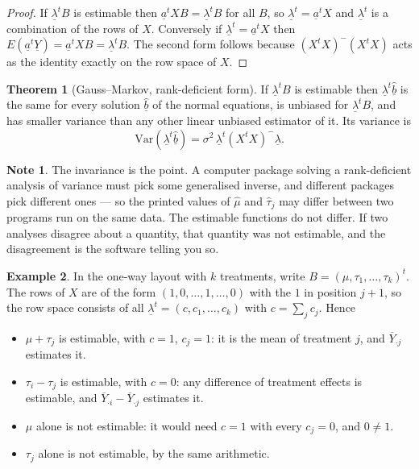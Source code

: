 \documentclass[11pt,a4paper]{article}
\theoremstyle{definition}
\newtheorem{thm}{Theorem}[subsection]
\newtheorem{exa}[thm]{Example}
\newtheorem*{note}{Note}
\begin{document}
\begin{proof}
If $\underline{\lambda}^tB$ is estimable then
$\underline{a}^tXB=\underline{\lambda}^tB$ for all $B$, so
$\underline{\lambda}^t=\underline{a}^tX$ and $\underline{\lambda}^t$ is a
combination of the rows of $X$. Conversely if
$\underline{\lambda}^t=\underline{a}^tX$ then
$E\left(\underline{a}^t\underline{Y}\right)=\underline{a}^tXB
=\underline{\lambda}^tB$. The second form follows because
$\left(X^tX\right)^{-}\left(X^tX\right)$ acts as the identity exactly on the
row space of $X$.
\end{proof}

\begin{thm}[Gauss--Markov, rank-deficient form]
\label{res:thm:gmdeficient}
If $\underline{\lambda}^tB$ is estimable then
$\underline{\lambda}^t\widehat{\underline{b}}$ is the same for every solution
$\widehat{\underline{b}}$ of the normal equations, is unbiased for
$\underline{\lambda}^tB$, and has smaller variance than any other linear
unbiased estimator of it. Its variance is
$$\text{Var}\left(\underline{\lambda}^t\widehat{\underline{b}}\right)
=\sigma^2\,\underline{\lambda}^t\left(X^tX\right)^{-}\underline{\lambda}.$$
\end{thm}

\begin{note}
The invariance is the point. A computer package solving a rank-deficient
analysis of variance must pick some generalised inverse, and different
packages pick different ones --- so the printed values of $\widehat{\mu}$ and
$\widehat{\tau}_j$ may differ between two programs run on the same data. The
estimable functions do not differ. If two analyses disagree about a quantity,
that quantity was not estimable, and the disagreement is the software telling
you so.
\end{note}

\begin{exa}
\label{res:exa:estowa}
In the one-way layout with $k$ treatments, write
$B=\left(\mu,\tau_1,\dots,\tau_k\right)^t$. The rows of $X$ are of the form
$\left(1,0,\dots,1,\dots,0\right)$ with the $1$ in position $j+1$, so the row
space consists of all $\underline{\lambda}^t=\left(c,c_1,\dots,c_k\right)$
with $c=\sum_j c_j$. Hence
\begin{itemize}
\item $\mu+\tau_j$ is estimable, with $c=1$, $c_j=1$: it is the mean of
treatment $j$, and $\overline{Y}_{\cdot j}$ estimates it.
\item $\tau_i-\tau_j$ is estimable, with $c=0$: any difference of treatment
effects is estimable, and $\overline{Y}_{\cdot i}-\overline{Y}_{\cdot j}$
estimates it.
\item $\mu$ alone is not estimable: it would need $c=1$ with every $c_j=0$,
and $0\neq1$.
\item $\tau_j$ alone is not estimable, by the same arithmetic.
\end{itemize}
\end{exa}
\end{document}
